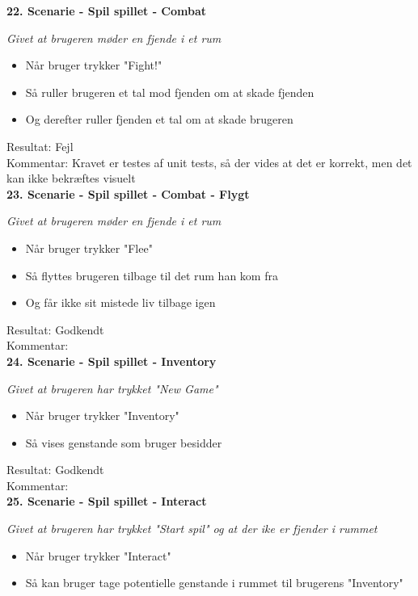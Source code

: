 \textbf{22. Scenarie - Spil spillet - Combat}

\textit{Givet at brugeren møder en fjende i et rum}

\begin{itemize}
  \item Når bruger trykker "Fight!"
  \item Så ruller brugeren et tal mod fjenden om at skade fjenden
  \item Og derefter ruller fjenden et tal om at skade brugeren
\end{itemize}

Resultat: Fejl\\
Kommentar: Kravet er testes af unit tests, så der vides at det er korrekt, men det kan ikke bekræftes visuelt\\

\textbf{23. Scenarie - Spil spillet - Combat - Flygt}

\textit{Givet at brugeren møder en fjende i et rum}

\begin{itemize}
  \item Når bruger trykker "Flee"
  \item Så flyttes brugeren tilbage til det rum han kom fra
  \item Og får ikke sit mistede liv tilbage igen
\end{itemize}

Resultat: Godkendt\\
Kommentar:\\

\textbf{24. Scenarie - Spil spillet - Inventory}

\textit{Givet at brugeren har trykket "New Game"}

\begin{itemize}
  \item Når bruger trykker "Inventory"
  \item Så vises genstande som bruger besidder
\end{itemize}

Resultat: Godkendt\\
Kommentar:\\

\textbf{25. Scenarie - Spil spillet - Interact}

\textit{Givet at brugeren har trykket "Start spil" og at der ike er fjender i rummet}

\begin{itemize}
  \item Når bruger trykker "Interact"
  \item Så kan bruger tage potentielle genstande i rummet til brugerens "Inventory"
\end{itemize}

